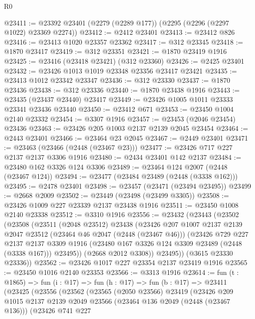 \begin{lexlean}{R0}
\begin{coremodule}
@23411 := @23392 @23401 (@2279 (@2289 @177)) (@2295 (@2296 (@2297 @1022) @23369 @2274))
@23412 := @2412 @23401
@23413 := @23412 @826
@23416 := @23413 @1020 @23357 @23362
@23417 := @312 @23345
@23418 := @1870 @23417
@23419 := @312 @23351
@23421 := @1870 @23419 @1916
@23425 := @23416 (@23418 @23421) (@312 @23360)
@23426 := @2425 @23401
@23432 := @23426 @1013 @1019 @23348 @23356 @23417 @23421
@23435 := @23413 @1012 @23342 @23347
@23436 := @312 @23330
@23437 := @1870 @23436
@23438 := @312 @23336
@23440 := @1870 @23438 @1916
@23443 := @23435 (@23437 @23440) @23417
@23449 := @23426 @1005 @1011 @23333 @23341 @23436 @23440
@23450 := @23412 @671
@23453 := @23450 @1004 @2140 @23332
@23454 := @3307 @1916
@23457 := @23453 (@2046 @23454) @23436
@23463 := @23426 @205 @1003 @2137 @2139 @2045 @23454
@23464 := @2443 @23401
@23466 := @23464 @23 @2045
@23467 := @2449 @23401
@23471 := @23463 (@23466 (@2448 (@23467 @23)))
@23477 := @23426 @717 @227 @2137 @2137 @3306 @1916
@23480 := @2434 @23401 @142 @2137
@23484 := @23480 @162 @3326 @124 @3306
@23489 := @23464 @124 @2007 (@2448 (@23467 @124))
@23494 := @23477 (@23484 @23489 (@2448 (@3338 @162)))
@23495 := @2478 @23401
@23498 := @23457 (@23471 (@23494 @23495))
@23499 := @2668 @2009
@23502 := @23449 (@23498 (@23499 @3305))
@23508 := @23426 @1009 @227 @23339 @2137 @23438 @1916
@23511 := @23450 @1008 @2140 @23338
@23512 := @3310 @1916
@23556 := @23432
    (@23443
      (@23502
        (@23508
          (@23511
            (@2048 @23512)
            @23438
            (@23426
              @207
              @1007
              @2137
              @2139
              @2047
              @23512
              (@23464 @46 @2047 (@2448 (@23467 @46)))
              (@23426
                @729
                @227
                @2137
                @2137
                @3309
                @1916
                (@23480 @167 @3326 @124 @3309 @23489 (@2448 (@3338 @167)))
                @23495))
            (@2668 @2012 @3308))
          @23495))
      (@3615 @23330 @23336))
@23562 := @23426 @1017 @227 @23354 @2137 @23419 @1916
@23565 := @23450 @1016 @2140 @23353
@23566 := @3313 @1916
@23614 := fun (t : @1865) =>
  fun (i : @17) =>
  fun (h : @17) =>
  fun (b : @17) =>
  @23411
    (@23425
      (@23556
        (@23562
          (@23565
            (@2050 @23566)
            @23419
            (@23426
              @209
              @1015
              @2137
              @2139
              @2049
              @23566
              (@23464 @136 @2049 (@2448 (@23467 @136)))
              (@23426
                @741
                @227

\end{coremodule}
\end{lexlean}
